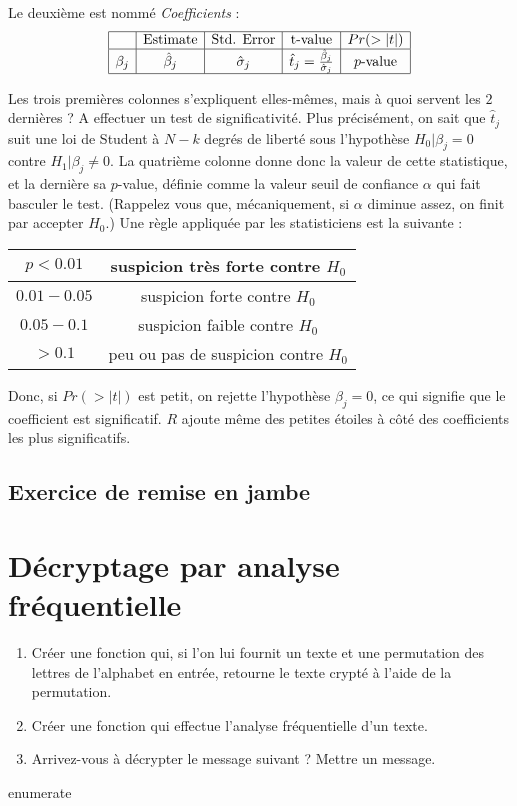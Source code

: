 \documentclass[a4paper]{article}
\begin{document}
Le deuxième est nommé \textit{Coefficients} :
\[\begin{array}{|c|c|c|c|c|}
	\hline
	& \text{Estimate} & \text{Std. Error} 	 & \text{t-value} & Pr(>|t|) \\
	\hline
 \beta_j & \hat \beta_j 	& \hat \sigma_j 	 & \hat t_j =\frac{\hat \beta_j}{\hat \sigma_j} & p\text{-value}\\
\hline
\end{array}\]

Les trois premières colonnes s'expliquent elles-mêmes, mais à quoi servent les $2$ dernières ? A effectuer un test de significativité. Plus précisément, on sait que $\hat t_j$ suit une loi de Student à $N-k$ degrés de liberté sous l'hypothèse $H_0 | \beta_j = 0$ contre $H_1 | \beta_j \neq 0$. La quatrième colonne donne donc la valeur de cette statistique, et la dernière sa $p$-value, définie comme la valeur seuil de confiance $\alpha$ qui fait basculer le test. (Rappelez vous que, mécaniquement, si $\alpha$ diminue assez, on finit par accepter $H_0$.) Une règle appliquée par les statisticiens est la suivante :\\

\begin{tabular}{|c|c|}
\hline
$p<0.01$ & suspicion très forte contre $H_0$ \\
\hline
$0.01-0.05$ & suspicion forte contre $H_0$ \\
\hline
$0.05-0.1$ & suspicion faible contre $H_0$ \\
\hline
$>0.1$ & peu ou pas de suspicion contre $H_0$\\
\hline
\end{tabular} 

Donc, si $Pr(>|t|)$ est petit, on rejette l'hypothèse $\beta_j = 0$, ce qui signifie que le coefficient est significatif. $R$ ajoute même des petites étoiles à côté des coefficients les plus significatifs.

\subsection{Exercice de remise en jambe}




\section{Décryptage par analyse fréquentielle}

\begin{enumerate}
\item Créer une fonction qui, si l'on lui fournit un texte et une permutation des lettres de l'alphabet en entrée, retourne le texte crypté à l'aide de la permutation.
\item Créer une fonction qui effectue l'analyse fréquentielle d'un texte.
\item Arrivez-vous à décrypter le message suivant ? Mettre un message. 
\end{enumerate}{enumerate}
\end{document}
